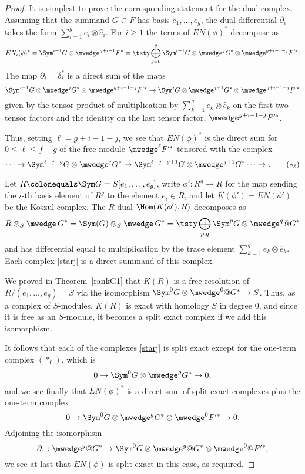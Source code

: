 \begin{proof}
It is simplest to prove the corresponding statement for the dual complex. 
Assuming that the summand $G\subset F$ has basis $e_{1},
\dots, e_{g}$,
the dual differential $\partial_{i}$ takes the form $\sum_{i=1}^{g}
e_{i}\otimes \hat e_{i}$.
For $i\geq 1$ the terms of $EN(\phi)^{*}$ decompose as
$$
EN_{i}(\phi)^{*} = \Sym^{i-1}G \otimes  \mwedge^{g+i-1}F^{*}  =
\tsty\bigoplus\limits_{j=0}^{g} \Sym^{i-1}G \otimes  \mwedge^{j}G^{*} \otimes
\mwedge^{g+i-1-j}F'^{*}.
$$
The map $\partial_{i}= \delta_{i}^{*}$ is a direct sum
of the maps
$$
\Sym^{i-1}G \otimes  \mwedge^{j}G^{*} \otimes \mwedge^{g+i-1-j}F'^{*}
\to
\Sym^{i}G \otimes  \mwedge^{j+1}G^{*} \otimes \mwedge^{g+i-1-j}F'^{*}
$$
given by the tensor product of multiplication by $\sum_{k=1}^{g} e_{k}\otimes
\hat e_{k}$
on the first two tensor factors and the identity on the last tensor factor,
$\mwedge^{g+i-1-j}F'^{*}$.

Thus, setting $\ell = g+i-1-j$, we see that   $EN(\phi)^{*}$ is the direct sum for
$0\leq \ell \leq f-g$ of the free module 
$\mwedge^{\ell}F'^{*}$ tensored with the complex
\begin{equation}
\cdots\to \Sym^{\ell + j -g}G \otimes  \mwedge^{j}G^{*}  \to
 \Sym^{\ell + j -g+1}G \otimes  \mwedge^{j+1}G^{*}\cdots\to .
\tag{$*_\ell$}
\label{starj}
\end{equation}


Let $R \colonequals \Sym G = S[e_{1}, \dots, e_{g}]$,  write 
$\phi': R^{g} \to R$ for the map sending the $i$-th basis
element of $R^{g}$ to the element $e_{i}\in R$, and let $K(\phi') = EN(\phi')$
be the Koszul complex. The $R$-dual $\Hom(K(\phi'), R)$ 
%
decomposes as
$$
R\otimes_{S}\mwedge \,G^* =   \Sym(G)\otimes_{S} \mwedge \,G^* = 
\tsty\bigoplus\limits_{p,q}\Sym^{p}G\otimes\mwedge^{q}@G^*
\vspace*{-3pt}
$$
and has differential equal to multiplication by the trace element $\sum_{k=1}^{g} e_{k}\otimes
\hat e_{k}$. Each complex \eqref{starj} is a direct summand of this complex.

We 
proved
in Theorem~\ref{rankG1} that $K(R)$ is a free resolution
of $R/(e_1, \dots, e_g)=S$ via the isomorphism
 $\Sym^{0}G\otimes \smash{\mwedge^{0}@G^*}\to S$. Thus,
 as a complex of $S$-modules, $K(R)$
 is exact with homology $S$ in degree 0, and since it is free as an $S$-module,
 it becomes a split exact complex if we add this isomorphism.
 
It follows
that each of the complexes \eqref{starj} is split exact except for the
one-term complex $(*_{0})$, which is
$$
0\to \Sym^{0}G\otimes\mwedge^{g}G^{*}\to 0,
$$
and we see finally that $EN(\phi)^{*}$ is a direct sum of split exact complexes
plus the one-term complex
$$
0\to \Sym^{0}G\otimes\mwedge^{g}G^{*}\otimes \mwedge^{0}F'^{*} \to 0.
$$
Adjoining the isomorphism
$$
\partial_{1}: \mwedge^{g}@G^{*} \to
\Sym^{0}G\otimes\mwedge^{g}@G^{*}\otimes \mwedge^{0}@F'^{*},
$$
  we see at last that $EN(\phi)$ is split exact in this case, as required.


\end{proof}
